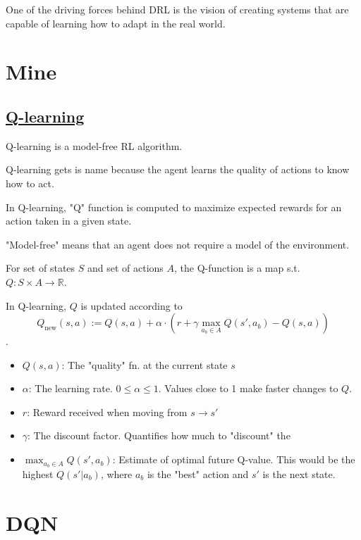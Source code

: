One of the
driving forces behind DRL is the vision of creating systems
that are capable of learning how to adapt in the real world.




\section{Mine}


\subsection*{\href{https://en.wikipedia.org/wiki/-learning}{Q-learning}}
\begin{quest}
	\item \cloze Q-learning is a model-free RL algorithm.
	
	\cloze Q-learning gets is name because the agent learns the quality of actions to know how to act. 

	\cloze In Q-learning, "Q" function is computed to maximize expected rewards for an action taken in a given state.  
	
	\cloze "Model-free" means that an agent does not require a model of the environment.
	
	\cloze For set of states $S$ and set of actions $A$, the Q-function is a map s.t. $Q:S\times A\to \mathbb{R}$.
	
	\item In Q-learning, $Q$ is updated according to 
	$$ Q_{\text{new}}(s, a) := Q(s, a) 
		+ \alpha \cdot 
			\left( r + \gamma \max_{a_b\in A} Q(s', a_b) 
			- Q(s, a) \right) $$.
	\begin{itemize}
		\item $Q(s, a)$: The "quality" fn. at the current state $s$
		\item $\alpha$: The learning rate. $0 \leq \alpha \leq 1$. Values close to 1 make faster changes to $Q$.  
		\item $r$: Reward received when moving from $s \to s'$
		\item $\gamma$: The discount factor. Quantifies how much to "discount" the 
		\item $\max_{a_b\in A} Q(s', a_b)$: Estimate of optimal future Q-value. This would be the highest $Q(s'|a_b)$, where $a_b$ is the "best" action and $s'$ is the next state.  
	\end{itemize}
\end{quest} 



\section{DQN }
\cite{mnih2015human}

